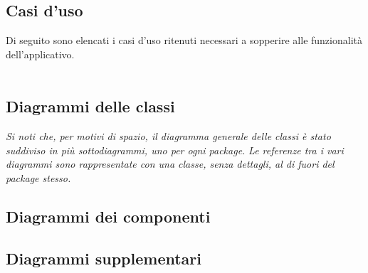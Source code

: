 \subsection{Casi d'uso}
Di seguito sono elencati i casi d'uso ritenuti necessari a sopperire alle funzionalità
dell'applicativo.
\\\\






\pagebreak


\pagebreak
\subsection{Diagrammi delle classi}

\textit{Si noti che, per motivi di spazio, il diagramma generale delle classi è stato suddiviso in più sottodiagrammi, uno per ogni package.}
\textit{Le referenze tra i vari diagrammi sono rappresentate con una classe, senza dettagli, al di fuori del package stesso.}






\pagebreak
\subsection{Diagrammi dei componenti}


\pagebreak
\subsection{Diagrammi supplementari}

\pagebreak

\pagebreak

